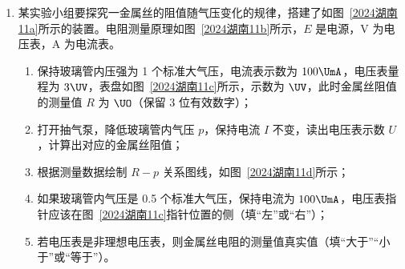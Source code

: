 \documentclass[\gkver]{gaokaozhenti}
\begin{document}
\begin{enumerate}
{

则根据正弦定理有 $\frac{v_{2}t_{1}}{\sin\left(2\alpha+\theta\right)}=\frac{v_{2}^{\prime}t_{2}}{\sin\theta}=\frac{\left(t_{1}+t_{2}\right)v_{1}}{\sin\left[180^{\circ}-\left(2\alpha+2\theta\right)\right]}$

AB．若 $\theta = 15^\circ$，带入数据 $v_{2} = 2 \Ums$，$v_{2}' = 1 \Ums$，解得当 $\alpha = 15^\circ$，$v_{1}$ 取得最大值为 $\sqrt{2} \Ums$，故 A 正确、B 错误；

CD．若 $\theta = 30^\circ$，带入数据 $v_{2} = 2 \Ums$，$v_{2}' = 1 \Ums$，解得当 $\alpha = 0^\circ$，$v_{1}$ 取得最大值为 $\frac{2\sqrt{3}}{3} \Ums$，故 C 正确、D 错误。

故选 AC。
}

\item
某实验小组要探究一金属丝的阻值随气压变化的规律，搭建了如图~\ref{2024湖南11a}所示的装置。电阻测量原理如图~\ref{2024湖南11b}所示，$E$ 是电源，V 为电压表，A 为电流表。
\begin{enumerate}
	\item
	保持玻璃管内压强为 1 个标准大气压，电流表示数为 $100 \UmA$，电压表量程为 $3 \UV$，表盘如图~\ref{2024湖南11c}所示，示数为 $\UV$，此时金属丝阻值的测量值 $R$ 为 $\UO$（保留 3 位有效数字）；
	\item
	打开抽气泵，降低玻璃管内气压 $p$，保持电流 $I$ 不变，读出电压表示数 $U$，计算出对应的金属丝阻值；
	\item
	根据测量数据绘制 $R - p$ 关系图线，如图~\ref{2024湖南11d}所示；
	\item
	如果玻璃管内气压是 0.5 个标准大气压，保持电流为 $100 \UmA$，电压表指针应该在图~\ref{2024湖南11c}指针位置的侧（填“左”或“右”）；
	\item
	若电压表是非理想电压表，则金属丝电阻的测量值真实值（填“大于”“小于”或“等于”）。
\end{enumerate}

\end{enumerate}
\end{document}
